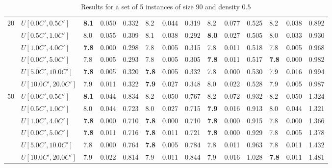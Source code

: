 \begin{table}[h]
{\begin{tabular}{|l|l||l|l|l||l|l|l||l|l|l||l|l|l|}
      \hline\hline
      \multirow{6}{*}{20} & $U[0.0C',0.5C']$ & \textbf{8.1} & 0.050 & 0.332 & 8.2 & 0.044 & 0.319 & 8.2 & 0.077 & 0.525 & 8.2 & 0.038 & 0.892 \\
       & $U[0.5C',1.0C']$ & 8.0 & 0.055 & 0.309 & 8.1 & 0.038 & 0.292 & \textbf{8.0} & 0.027 & 0.505 & 8.0 & 0.033 & 0.930 \\
       & $U[1.0C',4.0C']$ & \textbf{7.8} & 0.000 & 0.298 & 7.8 & 0.005 & 0.315 & 7.8 & 0.011 & 0.518 & 7.8 & 0.005 & 0.968 \\
       & $U[0.0C',5.0C']$ & 7.8 & 0.005 & 0.293 & 7.8 & 0.005 & 0.305 & \textbf{7.8} & 0.011 & 0.517 & \textbf{7.8} & 0.000 & 0.982 \\
       & $U[5.0C',10.0C']$ & \textbf{7.8} & 0.005 & 0.320 & \textbf{7.8} & 0.005 & 0.332 & 7.8 & 0.000 & 0.530 & 7.9 & 0.016 & 0.994 \\
       & $U[10.0C',20.0C']$ & 7.9 & 0.011 & 0.322 & \textbf{7.9} & 0.027 & 0.348 & 8.0 & 0.022 & 0.528 & 7.9 & 0.005 & 0.987 \\
      \hline\hline
      \multirow{6}{*}{50} & $U[0.0C',0.5C']$ & \textbf{8.1} & 0.044 & 0.834 & 8.2 & 0.050 & 0.767 & 8.2 & 0.072 & 0.932 & 8.2 & 0.050 & 1.324 \\
       & $U[0.5C',1.0C']$ & 8.0 & 0.044 & 0.723 & 8.0 & 0.027 & 0.715 & \textbf{7.9} & 0.016 & 0.913 & 8.0 & 0.044 & 1.321 \\
       & $U[1.0C',4.0C']$ & \textbf{7.8} & 0.000 & 0.710 & \textbf{7.8} & 0.000 & 0.710 & \textbf{7.8} & 0.000 & 0.915 & 7.8 & 0.000 & 1.366 \\
       & $U[0.0C',5.0C']$ & \textbf{7.8} & 0.011 & 0.716 & \textbf{7.8} & 0.011 & 0.721 & \textbf{7.8} & 0.000 & 0.929 & 7.8 & 0.005 & 1.378 \\
       & $U[5.0C',10.0C']$ & 7.8 & 0.000 & 0.764 & \textbf{7.8} & 0.005 & 0.784 & 7.8 & 0.011 & 0.963 & 7.8 & 0.011 & 1.432 \\
       & $U[10.0C',20.0C']$ & 7.9 & 0.022 & 0.814 & 7.9 & 0.011 & 0.844 & 7.9 & 0.016 & 1.028 & \textbf{7.8} & 0.011 & 1.481 \\
      \hline
      \end{tabular}
      }
      \caption{Results for a set of 5 instances of size $90$ and density $0.5$}
      \label{tab:pcpn90}\end{table}


